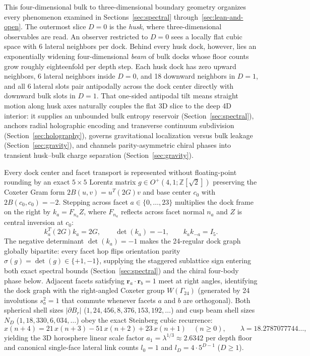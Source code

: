 This four-dimensional bulk to three-dimensional boundary geometry organizes every phenomenon examined in
Sections~\ref{sec:spectral} through~\ref{sec:lean-and-open}. The outermost slice $D = 0$ is the \emph{husk}, where
three-dimensional observables are read. An observer restricted to $D = 0$ sees a locally flat cubic space with 6
lateral neighbors per dock. Behind every husk dock, however, lies an exponentially widening four-dimensional \emph{beam}
of bulk docks whose floor counts grow roughly eighteenfold per depth step. Each husk dock has zero upward neighbors, 6
lateral neighbors inside $D = 0$, and 18 downward neighbors in $D = 1$, and all 6 lateral slots pair antipodally across
the dock center directly with downward bulk slots in $D = 1$. That one-sided antipodal tilt means straight motion along
husk axes naturally couples the flat 3D slice to the deep 4D interior: it supplies an unbounded bulk entropy reservoir
(Section~\ref{sec:spectral}), anchors radial holographic encoding and transverse continuum subdivision
(Section~\ref{sec:holography}), governs gravitational localization versus bulk leakage (Section~\ref{sec:gravity}), and
channels parity-asymmetric chiral phases into transient husk--bulk charge separation (Section~\ref{sec:gravity}).

Every dock center and facet transport is represented without floating-point rounding by an exact $5 \times 5$ Lorentz
matrix $g \in O^+(4,1; \mathbb{Z}[\sqrt{2}])$ preserving the Coxeter Gram form $2B(u, v) = u^T (2G) v$ and base
center $c_0$ with $2B(c_0, c_0) = -2$. Stepping across facet $a \in \{0, \dots, 23\}$ multiplies the dock frame on the
right by $k_a = F_{n_a} Z$, where $F_{n_a}$ reflects across facet normal $n_a$ and $Z$ is central inversion at $c_0$:
\begin{equation}
k_a^T (2G) k_a = 2G,
\qquad
\det(k_a) = -1,
\qquad
k_a k_{-a} = I_5.
\label{eq:transport}
\end{equation}
The negative determinant $\det(k_a) = -1$ makes the 24-regular dock graph globally bipartite: every facet hop flips
orientation parity $\sigma(g) = \det(g) \in \{+1, -1\}$, supplying the staggered sublattice sign entering both exact
spectral bounds (Section~\ref{sec:spectral}) and the chiral four-body phase below. Adjacent facets satisfying
$\mathbf{r}_a \cdot \mathbf{r}_b = 1$ meet at right angles, identifying the dock graph with the right-angled Coxeter
group $W(\Gamma_{24})$ (generated by 24 involutions $s_a^2 = 1$ that commute whenever facets $a$ and $b$ are orthogonal).
Both spherical shell sizes $|\partial B_r|$ ($1, 24, 456, 8{,}376, 153{,}192, \dots$) and cusp beam shell sizes $N_D$
($1, 18, 330, 6{,}034, \dots$) obey the exact Steinberg cubic recurrence:
\begin{equation}
x(n + 4) = 21\, x(n + 3) - 51\, x(n + 2) + 23\, x(n + 1) \quad (n \ge 0),
\qquad
\lambda = 18.2787077744\ldots,
\label{eq:steinberg-cubic}
\end{equation}
yielding the 3D horosphere linear scale factor $a_1 = \lambda^{1/3} \approx 2.6342$ per depth floor and canonical
single-face lateral link counts $l_0 = 1$ and $l_D = 4 \cdot 5^{D-1}$ ($D \ge 1$).

